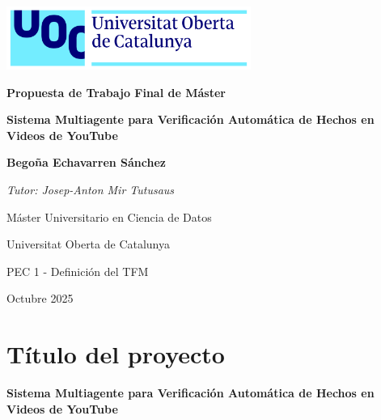 \documentclass[12pt,a4paper]{article}
\begin{document}
\begin{titlepage}
    \begin{center}
    \vspace*{0.5cm}

    \includegraphics[width=0.6\textwidth]{figs/uoc_logo.png}

    \vspace{1.5cm}

    {\Huge \textbf{Propuesta de Trabajo Final de Máster}}

    \vspace{2cm}

    {\LARGE \textbf{Sistema Multiagente para Verificación Automática de Hechos en Videos de YouTube}}

    \vspace{2.5cm}

    \textbf{\large Begoña Echavarren Sánchez}

    \vspace{0.5cm}

    \textit{Tutor: Josep-Anton Mir Tutusaus}

    \vspace{2cm}

    {\large Máster Universitario en Ciencia de Datos}

    {\large Universitat Oberta de Catalunya}

    \vspace{1cm}

    {\large PEC 1 - Definición del TFM}

    \vspace{0.5cm}

    {\large Octubre 2025}

    \end{center}
\end{titlepage}

\newpage
{}

\section{Título del proyecto}

\textbf{Sistema Multiagente para Verificación Automática de Hechos en Videos de YouTube}
\end{document}
